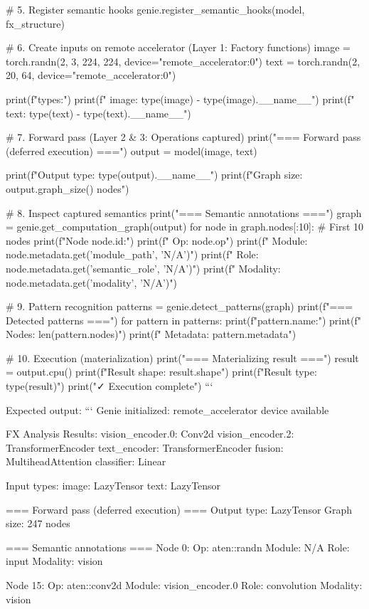 # 5. Register semantic hooks
genie.register_semantic_hooks(model, fx_structure)

# 6. Create inputs on remote accelerator (Layer 1: Factory functions)
image = torch.randn(2, 3, 224, 224, device="remote_accelerator:0")
text = torch.randn(2, 20, 64, device="remote_accelerator:0")

print(f"\nInput types:")
print(f"  image: {type(image)} - {type(image).__name__}")
print(f"  text: {type(text)} - {type(text).__name__}")

# 7. Forward pass (Layer 2 & 3: Operations captured)
print("\n=== Forward pass (deferred execution) ===")
output = model(image, text)

print(f"Output type: {type(output).__name__}")
print(f"Graph size: {output.graph_size()} nodes")

# 8. Inspect captured semantics
print("\n=== Semantic annotations ===")
graph = genie.get_computation_graph(output)
for node in graph.nodes[:10]:  # First 10 nodes
    print(f"Node {node.id}:")
    print(f"  Op: {node.op}")
    print(f"  Module: {node.metadata.get('module_path', 'N/A')}")
    print(f"  Role: {node.metadata.get('semantic_role', 'N/A')}")
    print(f"  Modality: {node.metadata.get('modality', 'N/A')}")

# 9. Pattern recognition
patterns = genie.detect_patterns(graph)
print(f"\n=== Detected patterns ===")
for pattern in patterns:
    print(f"{pattern.name}:")
    print(f"  Nodes: {len(pattern.nodes)}")
    print(f"  Metadata: {pattern.metadata}")

# 10. Execution (materialization)
print("\n=== Materializing result ===")
result = output.cpu()
print(f"Result shape: {result.shape}")
print(f"Result type: {type(result)}")
print("✓ Execution complete")
```

Expected output:
```
Genie initialized: remote_accelerator device available

FX Analysis Results:
  vision_encoder.0: Conv2d
  vision_encoder.2: TransformerEncoder
  text_encoder: TransformerEncoder
  fusion: MultiheadAttention
  classifier: Linear

Input types:
  image: LazyTensor
  text: LazyTensor

=== Forward pass (deferred execution) ===
Output type: LazyTensor
Graph size: 247 nodes

=== Semantic annotations ===
Node 0:
  Op: aten::randn
  Module: N/A
  Role: input
  Modality: vision

Node 15:
  Op: aten::conv2d
  Module: vision_encoder.0
  Role: convolution
  Modality: vision

